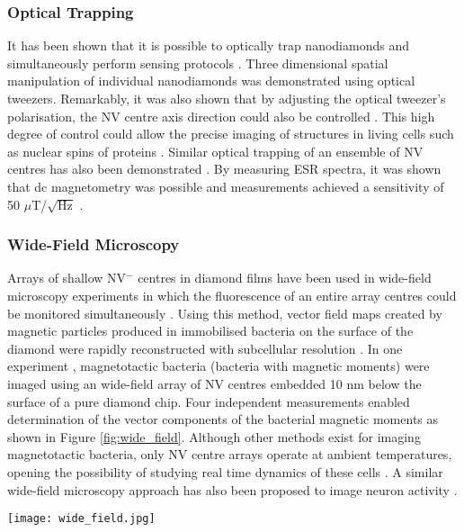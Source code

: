 \documentclass[10pt]{article}
\newenvironment{Figure}
  {\par\medskip\noindent\minipage{\linewidth}}
  {\endminipage\par\medskip}
\begin{document}
\begin{multicols}{2}
\subsubsection{Optical Trapping}
It has been shown that it is possible to optically trap nanodiamonds and simultaneously perform sensing protocols \cite{horowitz2012electron,geiselmann2013three}. Three dimensional spatial manipulation of individual nanodiamonds was demonstrated using optical tweezers. Remarkably, it was also shown that by adjusting the optical tweezer's polarisation, the NV centre axis direction could also be controlled \cite{geiselmann2013three}. This high degree of control could allow the precise imaging of structures in living cells such as nuclear spins of proteins \cite{geiselmann2013three}. Similar optical trapping of an ensemble of NV centres has also been demonstrated \cite{horowitz2012electron}. By measuring ESR spectra, it was shown that dc magnetometry was possible and measurements achieved a sensitivity of 50 $\mu$T/$\sqrt{\textrm{Hz}}$ \cite{horowitz2012electron}. 

\subsubsection{Wide-Field Microscopy}
Arrays of shallow NV$^-$ centres in diamond films have been used in wide-field microscopy experiments in which the fluorescence of an entire array centres could be monitored simultaneously \cite{le2013optical}. Using this method, vector field maps created by magnetic particles produced in immobilised bacteria on the surface of the diamond were rapidly reconstructed with subcellular resolution \cite{le2013optical}. In one experiment \cite{le2013optical}, magnetotactic bacteria (bacteria with magnetic moments) were imaged using an wide-field array of NV centres embedded 10 nm below the surface of a pure diamond chip. Four independent measurements enabled determination of the vector components of the bacterial magnetic moments as shown in Figure \ref{fig:wide_field}. Although other methods exist for imaging magnetotactic bacteria, only NV centre arrays operate at ambient temperatures, opening the possibility of studying real time dynamics of these cells \cite{le2013optical}. A similar wide-field microscopy approach has also been proposed to image neuron activity \cite{hall2012high}. 

\begin{Figure}
  \texttt{[image: wide\_field.jpg]}
  \label{fig:wide_field}
\end{Figure}


\end{multicols}
\end{document}
